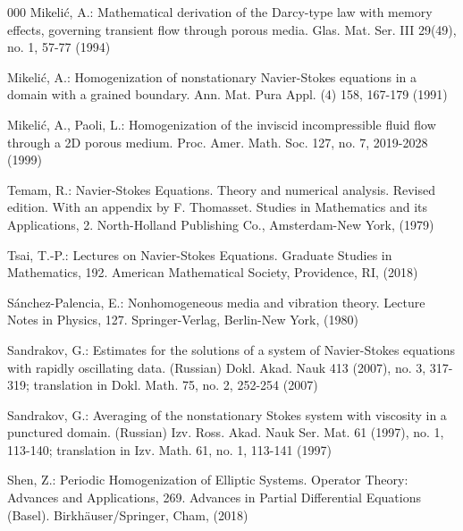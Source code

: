 \documentclass[13pt,CJK]{article}
\theoremstyle{plain}                       %
\theoremstyle{remark}
\numberwithin{equation}{section}
\begin{document}
\begin{thebibliography}{000}
Mikeli\'c, A.:
Mathematical derivation of the Darcy-type law with memory effects,
governing transient flow through porous media. Glas. Mat. Ser. III 29(49), no. 1, 57-77
(1994)

Mikeli\'c, A.:
Homogenization of nonstationary Navier-Stokes equations in a domain with a grained boundary. Ann. Mat. Pura Appl. (4) 158, 167-179
(1991)


Mikeli\'c, A., Paoli, L.:
Homogenization of the inviscid incompressible fluid flow through a 2D porous medium. Proc. Amer. Math. Soc. 127, no. 7, 2019-2028
(1999)




Temam, R.: Navier-Stokes Equations.
Theory and numerical analysis. Revised edition.
With an appendix by F. Thomasset. Studies in Mathematics and its Applications, 2. North-Holland Publishing Co., Amsterdam-New York,
(1979)

Tsai, T.-P.:
Lectures on Navier-Stokes Equations.
Graduate Studies in Mathematics, 192. American Mathematical Society, Providence, RI,
(2018)



S\'anchez-Palencia, E.: Nonhomogeneous media and vibration theory. Lecture Notes in Physics, 127. Springer-Verlag, Berlin-New York,
(1980)

Sandrakov, G.:
Estimates for the solutions of a system of Navier-Stokes equations with rapidly oscillating data.
(Russian) Dokl. Akad. Nauk 413 (2007), no. 3, 317-319; translation in Dokl. Math. 75,
no. 2, 252-254
(2007)



Sandrakov, G.:
Averaging of the nonstationary Stokes system with viscosity in a punctured domain.
(Russian) Izv. Ross. Akad. Nauk Ser. Mat. 61 (1997), no. 1, 113-140;
translation in Izv. Math. 61, no. 1, 113-141
(1997)



Shen, Z.: Periodic Homogenization of Elliptic Systems.
Operator Theory: Advances and Applications, 269.
Advances in Partial Differential Equations (Basel). Birkhäuser/Springer, Cham, (2018)



\end{thebibliography}
\end{document}
